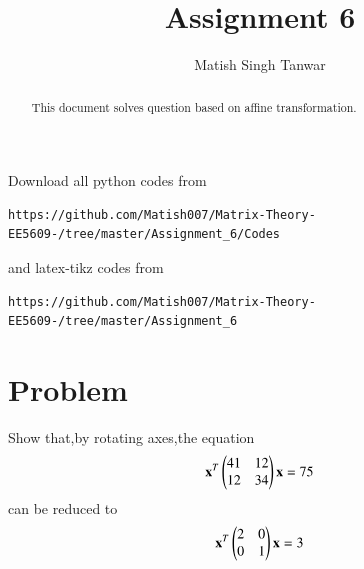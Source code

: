\documentclass[journal,12pt,twocolumn]{IEEEtran}
\begin{document}
 \vspace{3cm}
 \title{Assignment 6}
 \author{Matish Singh Tanwar}
 \maketitle
 \newpage
 \bigskip
 \renewcommand{\thetable}{\theenumi}
\vspace{1.0cm}
\begin{abstract}
This document solves question based on affine transformation.
\end{abstract}
\vspace{0.5cm}
%
Download all python codes from 
\begin{lstlisting}
https://github.com/Matish007/Matrix-Theory-EE5609-/tree/master/Assignment_6/Codes
\end{lstlisting}
%
and latex-tikz codes from 
\begin{lstlisting}
https://github.com/Matish007/Matrix-Theory-EE5609-/tree/master/Assignment_6
\end{lstlisting}
%
%
\vspace{0.5mm}
\section{Problem}
Show that,by rotating axes,the equation
\begin{align}
 \mathbf{x}^T\begin{pmatrix}41&12\\12&34\end{pmatrix}\mathbf{x}=75\label{1}
\end{align}
can be reduced to
\begin{align}
 \mathbf{x}^T\begin{pmatrix}2&0\\0&1\end{pmatrix}\mathbf{x}=3
\end{align}
%
\end{document}
